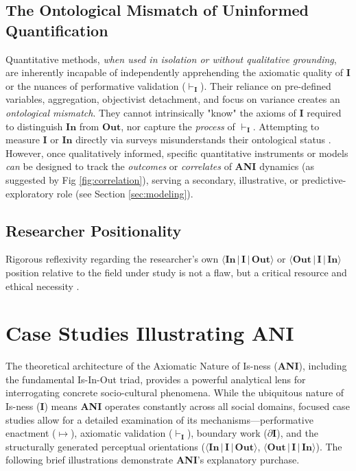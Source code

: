 \documentclass{article}
\newcommand{\ANI}{\textbf{ANI}}             %
\newcommand{\Isness}{\mathbf{I}}            %
\newcommand{\Inness}{\mathbf{In}}           %
\newcommand{\Outness}{\mathbf{Out}}         %
\newcommand{\enactment}{\ensuremath{\mapsto}} %
\newcommand{\validates}[1]{\ensuremath{\vdash_{#1}}} %
\newcommand{\boundary}[1]{\ensuremath{\partial #1}} %
\newcommand{\orientation}[3]{\ensuremath{\langle #1 \,|\, #2 \,|\, #3 \rangle}} %
\begin{document}
\subsection{The Ontological Mismatch of Uninformed Quantification}

Quantitative methods, \textit{when used in isolation or without qualitative grounding}, are inherently incapable of independently apprehending the axiomatic quality of $\Isness$ or the nuances of performative validation ($\validates{\Isness}$). Their reliance on pre-defined variables, aggregation, objectivist detachment, and focus on variance creates an \textit{ontological mismatch}. They cannot intrinsically "know" the axioms of $\Isness$ required to distinguish $\Inness$ from $\Outness$, nor capture the \textit{process} of $\validates{\Isness}$. Attempting to measure $\Isness$ or $\Inness$ directly via surveys misunderstands their ontological status \citep{Bourdieu1990}. However, once qualitatively informed, specific quantitative instruments or models \textit{can} be designed to track the \textit{outcomes} or \textit{correlates} of \ANI{} dynamics (as suggested by Fig \ref{fig:correlation}), serving a secondary, illustrative, or predictive-exploratory role (see Section \ref{sec:modeling}).

\subsection{Researcher Positionality}

Rigorous reflexivity regarding the researcher's own $\orientation{\Inness}{\Isness}{\Outness}$ or $\orientation{\Outness}{\Isness}{\Inness}$ position relative to the field under study is not a flaw, but a critical resource and ethical necessity \citep{Bourdieu1990}.

\section{Case Studies Illustrating ANI}

The theoretical architecture of the Axiomatic Nature of Is-ness (\ANI{}), including the fundamental Is-In-Out triad, provides a powerful analytical lens for interrogating concrete socio-cultural phenomena. While the ubiquitous nature of Is-ness ($\Isness$) means \ANI{} operates constantly across all social domains, focused case studies allow for a detailed examination of its mechanisms—performative enactment ($\enactment$), axiomatic validation ($\validates{\Isness}$), boundary work ($\boundary{\Isness}$), and the structurally generated perceptual orientations ($\orientation{\Inness}{\Isness}{\Outness}$, $\orientation{\Outness}{\Isness}{\Inness}$). The following brief illustrations demonstrate \ANI{}'s explanatory purchase.
\end{document}
